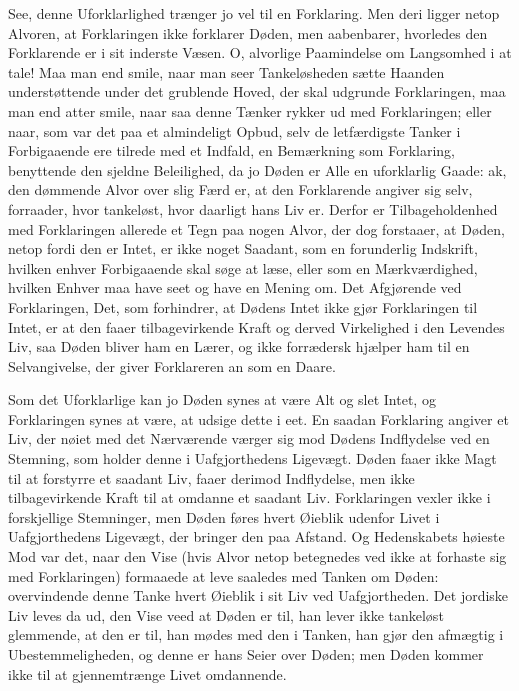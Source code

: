 \documentclass[12pt,a4paper]{article}
\begin{document}
See, denne Uforklarlighed trænger jo vel til en Forklaring. Men deri ligger netop Alvoren, at Forklaringen ikke forklarer Døden, men aabenbarer, hvorledes den Forklarende er i sit inderste Væsen. O, alvorlige Paamindelse om Langsomhed i at tale! Maa man end smile, naar man seer Tankeløsheden sætte Haanden understøttende under det grublende Hoved, der skal udgrunde Forklaringen, maa man end atter smile, naar saa denne Tænker rykker ud med Forklaringen; eller naar, som var det paa et almindeligt Opbud, selv de letfærdigste Tanker i Forbigaaende ere tilrede med et Indfald, en Bemærkning som Forklaring, benyttende den sjeldne Beleilighed, da jo Døden er Alle en uforklarlig Gaade: ak, den dømmende Alvor over slig Færd er, at den Forklarende angiver sig selv, forraader, hvor tankeløst, hvor daarligt hans Liv er. Derfor er Tilbageholdenhed med Forklaringen allerede et Tegn paa nogen Alvor, der dog forstaaer, at Døden, netop fordi den er Intet, er ikke noget Saadant, som en forunderlig Indskrift, hvilken enhver Forbigaaende skal søge at læse, eller som en Mærkværdighed, hvilken Enhver maa have seet og have en Mening om. Det Afgjørende ved Forklaringen, Det, som forhindrer, at Dødens Intet ikke gjør Forklaringen til Intet, er at den faaer tilbagevirkende Kraft og derved Virkelighed i den Levendes Liv, saa Døden bliver ham en Lærer, og ikke forrædersk hjælper ham til en Selvangivelse, der giver Forklareren an som en Daare.

Som det Uforklarlige kan jo Døden synes at være Alt og slet Intet, og Forklaringen synes at være, at udsige dette i eet. En saadan Forklaring angiver et Liv, der nøiet med det Nærværende værger sig mod Dødens Indflydelse ved en Stemning, som holder denne i Uafgjorthedens Ligevægt. Døden faaer ikke Magt til at forstyrre et saadant Liv, faaer derimod Indflydelse, men ikke tilbagevirkende Kraft til at omdanne et saadant Liv. Forklaringen vexler ikke i forskjellige Stemninger, men Døden føres hvert Øieblik udenfor Livet i Uafgjorthedens Ligevægt, der bringer den paa Afstand. Og Hedenskabets høieste Mod var det, naar den Vise (hvis Alvor netop betegnedes ved ikke at forhaste sig med Forklaringen) formaaede at leve saaledes med Tanken om Døden: overvindende denne Tanke hvert Øieblik i sit Liv ved Uafgjortheden. Det jordiske Liv leves da ud, den Vise veed at Døden er til, han lever ikke tankeløst glemmende, at den er til, han mødes med den i Tanken, han gjør den afmægtig i Ubestemmeligheden, og denne er hans Seier over Døden; men Døden kommer ikke til at gjennemtrænge Livet omdannende.
\end{document}
